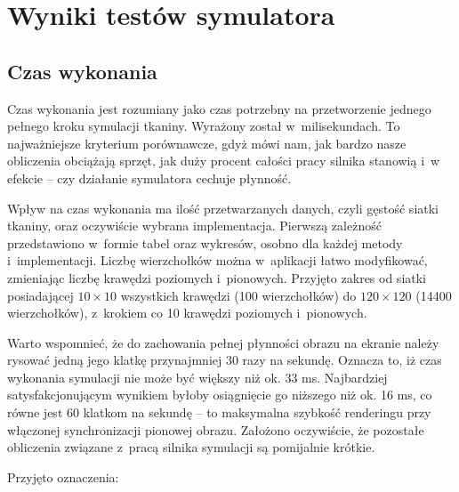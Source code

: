 \chapter{Wyniki testów symulatora}
\label{t:wyniki}

	\section{Czas wykonania}
	\label{t:wyniki:czas_wykonania}

		Czas wykonania jest rozumiany jako czas potrzebny na przetworzenie jednego pełnego kroku symulacji tkaniny. Wyrażony został w~milisekundach. To najważniejsze kryterium porównawcze, gdyż mówi nam, jak bardzo nasze obliczenia obciążają sprzęt, jak duży procent całości pracy silnika stanowią i~w efekcie -- czy działanie symulatora cechuje płynność. 
		
		Wpływ na czas wykonania ma ilość przetwarzanych danych, czyli gęstość siatki tkaniny, oraz oczywiście wybrana implementacja. Pierwszą zależność przedstawiono w~formie tabel oraz wykresów, osobno dla każdej metody i~implementacji. Liczbę wierzchołków można w~aplikacji łatwo modyfikować, zmieniając liczbę krawędzi poziomych i~pionowych. Przyjęto zakres od siatki posiadającej \(10 \times 10 \) wszystkich krawędzi (100 wierzchołków) do \( 120 \times 120 \) (14400 wierzchołków), z~krokiem co 10 krawędzi poziomych i~pionowych.
		
		Warto wspomnieć, że do zachowania pełnej płynności obrazu na ekranie należy rysować jedną jego klatkę przynajmniej 30 razy na sekundę. Oznacza to, iż czas wykonania symulacji nie może być większy niż ok. 33 ms. Najbardziej satysfakcjonującym wynikiem byłoby osiągnięcie go niższego niż ok. 16 ms, co równe jest 60 klatkom na sekundę -- to maksymalna szybkość renderingu przy włączonej synchronizacji pionowej obrazu. Założono oczywiście, że pozostałe obliczenia związane z~pracą silnika symulacji są pomijalnie krótkie.
		
		Przyjęto oznaczenia:
		
